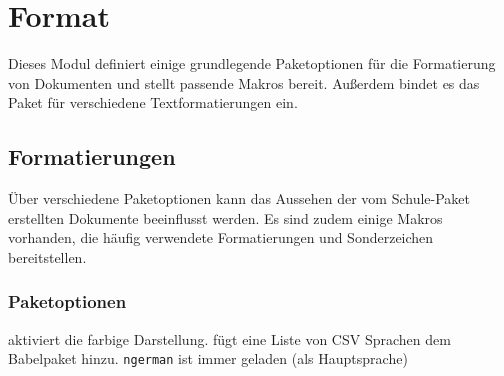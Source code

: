 \section{Format}
\label{modul:format}
Dieses Modul definiert einige grundlegende Paketoptionen für die Formatierung von Dokumenten und stellt passende Makros bereit. Außerdem bindet es das Paket  für verschiedene Textformatierungen ein.

\subsection{Formatierungen}
    Über verschiedene Paketoptionen kann das Aussehen der vom Schule-Paket erstellten Dokumente beeinflusst werden. Es sind zudem einige Makros vorhanden, die häufig verwendete Formatierungen und Sonderzeichen bereitstellen.

\subsubsection{Paketoptionen}
\begin{options}
     aktiviert die farbige Darstellung.
     fügt eine Liste von CSV Sprachen dem Babelpaket hinzu. \texttt{ngerman} ist immer geladen (als Hauptsprache)
\end{options}

